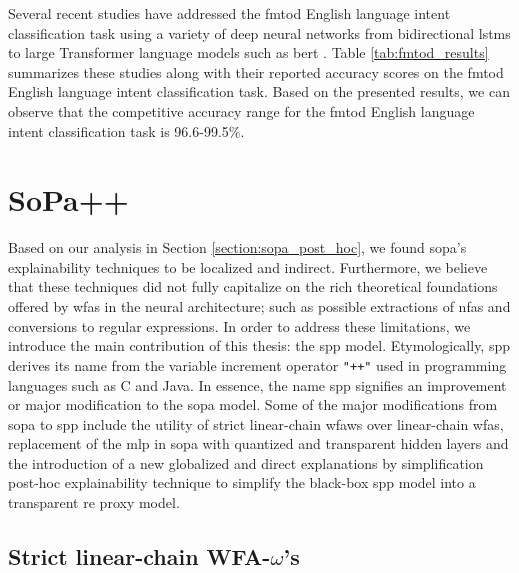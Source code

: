 \label{section:fmtod_performance}

Several recent studies have addressed the \ac{fmtod} English language intent
classification task using a variety of deep neural networks from bidirectional
\ac{lstm}s to large Transformer language models such as \ac{bert}
\citep{schuster-etal-2019-cross-lingual,zhang2019joint,zhang-etal-2020-intent}.
Table \ref{tab:fmtod_results} summarizes these studies along with their reported
accuracy scores on the \ac{fmtod} English language intent classification task.
Based on the presented results, we can observe that the competitive accuracy
range for the \ac{fmtod} English language intent classification task is
96.6-99.5$\%$.

\section{SoPa++}

Based on our analysis in Section \ref{section:sopa_post_hoc}, we found \ac{sopa}'s
explainability techniques to be localized and indirect. Furthermore, we believe
that these techniques did not fully capitalize on the rich theoretical
foundations offered by \ac{wfas} in the neural architecture; such as possible
extractions of \ac{nfas} and conversions to regular expressions. In order to
address these limitations, we introduce the main contribution of this thesis:
the \ac{spp} model. Etymologically, \ac{spp} derives its name from the variable
increment operator \texttt{"++"} used in programming languages such as C and
Java. In essence, the name \ac{spp} signifies an improvement or major modification
to the \ac{sopa} model. Some of the major modifications from \ac{sopa} to \ac{spp} include
the utility of strict linear-chain \ac{wfaws} over linear-chain \ac{wfas},
replacement of the \ac{mlp} in \ac{sopa} with quantized and transparent hidden layers
and the introduction of a new globalized and direct explanations by
simplification post-hoc explainability technique to simplify the black-box
\ac{spp} model into a transparent \ac{re} proxy model.

\subsection{Strict linear-chain WFA-$\omega$'s}

